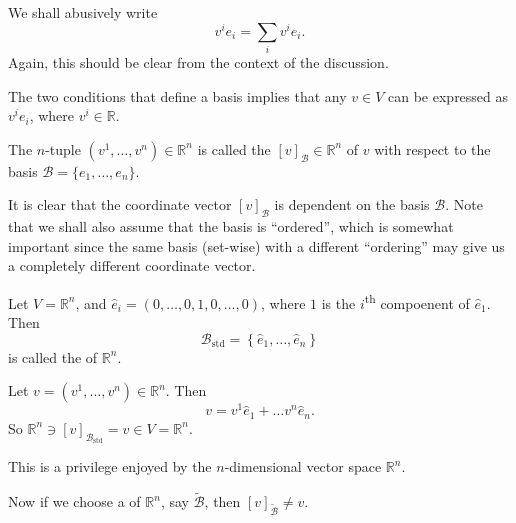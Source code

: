 \documentclass[notoc,notitlepage]{tufte-book}
\DeclareMathOperator{\std}{std}
\begin{document}
\begin{note}
  We shall abusively write
  \begin{equation*}
    v^i e_i = \sum_{i} v^i e_i.
  \end{equation*}
  Again, this should be clear from the context of the discussion.
\end{note}

The two conditions that define a basis implies that any $v \in V$ can be expressed as $v^i e_i$, where $v^i \in \mathbb{R}$.

\begin{defn}\label{defn:coordinate_vector}
  The $n$-tuple $(v^1, \ldots, v^n) \in \mathbb{R}^n$ is called the  $[v]_{\mathcal{B}} \in \mathbb{R}^n$ of $v$ with respect to the basis $\mathcal{B} = \{ e_1, \ldots, e_n \}$.
\end{defn}

\begin{note}
  It is clear that the coordinate vector $[v]_{\mathcal{B}}$ is dependent on the basis $\mathcal{B}$. Note that we shall also assume that the basis is ``ordered'', which is somewhat important since the same basis (set-wise) with a different ``ordering'' may give us a completely different coordinate vector.
\end{note}

\begin{eg}
  Let $V = \mathbb{R}^n$, and $\hat{e}_i = ( 0, \ldots, 0, 1, 0, \ldots, 0 )$, where $1$ is the $i$\textsuperscript{th} compoenent of $\hat{e}_1$. Then
  \begin{equation*}
    \mathcal{B}_{\std} = \left\{ \hat{e}_1, \ldots, \hat{e}_n \right\}
  \end{equation*}
  is called the  of $\mathbb{R}^n$.
\end{eg}

\begin{note}
  Let $v = (v^1, \ldots, v^n) \in \mathbb{R}^n$. Then
  \begin{equation*}
    v = v^1 \hat{e}_1 + \hdots v^n \hat{e}_n.
  \end{equation*}
  So $\mathbb{R}^n \ni [v]_{\mathcal{B}_{\std}} = v \in V = \mathbb{R}^n$.

  This is a privilege enjoyed by the $n$-dimensional vector space $\mathbb{R}^n$.
\end{note}

Now if we choose a  of $\mathbb{R}^n$, say $\tilde{\mathcal{B}}$, then $[v]_{\tilde{\mathcal{B}}} \neq v$.
\end{document}

